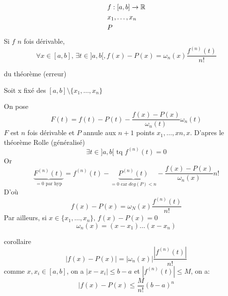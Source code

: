 \begin{theorem}
    \begin{align*}
        &f: [a, b] \to \mathbb{R} \\
        &x_1, \ldots, x_n \\
        &P
    \end{align*}
    Si $f$  $n$ fois dérivable,  
    \[
        \forall x \in [a, b], \, \exists t \in ]a, b[, f(x) - P(x) = \omega_n(x)\frac{f^{(n)}(t)}{n!}
    \] 
\end{theorem}
\begin{preuve} du théorème (erreur)
    \par
    Soit x fixé des $[a, b] \setminus \{x_1, \ldots, x_n\}$
    \par
    On pose 
    \[
    F(t) = f(t) - P(t) - \frac{f(x) - P(x)}{\omega_n(t)}\omega_n(t)
    \] 
    $F$ est  $n$ fois dérivable et  $P$ annule aux  $n+1$ points  $x_1, \ldots, xn, x$. D'apres le théorème Rolle (généralisé) 
    \[
        \exists t \in ]a, b[ \text{ tq } f^{(n)}(t) = 0
    \] 
    Or
    \[
        \underbrace{F^{(n)}(t)}_{= 0 \text{ par hyp}} = f^{(n)}(t) - \underbrace{P^{(n)}(t)}_{= 0 \text{ car } deg(P) < n} - \frac{f(x) - P(x)}{\omega_n(x)}n!
    \] 
    D'où
    \[
        f(x) - P(x) = \omega_N(x) \frac{f^{(n)}(t)}{n!}
    \] 
    Par ailleurs, si $x \in \{x_1, \ldots, x_n\}, \, f(x) - P(x) = 0$
    \[
    \omega_n(x) = (x - x_1)\ldots(x - x_n)
    \] 
\end{preuve}
\begin{preuve} corollaire
   \[
       |f(x) - P(x)| = |\omega_n(x)| \frac{|f^{(n)}(t)|}{n!}
   \]  
   comme $x, x_i \in [a, b]$, on a  $|x - x_i| \le b - a$ et $|f^{(n)}(t)| \le M$, on a:
   \[
   |f(x) - P(x) \le \frac{M}{n!}(b - a)^n
   \] 
\end{preuve}

